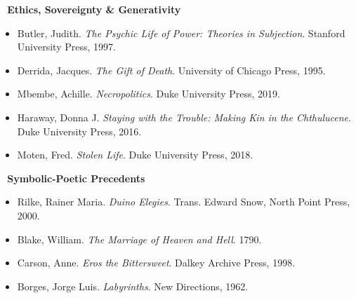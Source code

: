 \textbf{🧬 Ethics, Sovereignty \& Generativity}

\begin{itemize}
\tightlist
\item
  Butler, Judith. \emph{The Psychic Life of Power: Theories in
  Subjection}. Stanford University Press, 1997.
\item
  Derrida, Jacques. \emph{The Gift of Death}. University of Chicago
  Press, 1995.
\item
  Mbembe, Achille. \emph{Necropolitics}. Duke University Press, 2019.
\item
  Haraway, Donna J. \emph{Staying with the Trouble: Making Kin in the
  Chthulucene}. Duke University Press, 2016.
\item
  Moten, Fred. \emph{Stolen Life}. Duke University Press, 2018.
\end{itemize}

\textbf{🔮 Symbolic-Poetic Precedents}

\begin{itemize}
\tightlist
\item
  Rilke, Rainer Maria. \emph{Duino Elegies}. Trans. Edward Snow, North
  Point Press, 2000.
\item
  Blake, William. \emph{The Marriage of Heaven and Hell}. 1790.
\item
  Carson, Anne. \emph{Eros the Bittersweet}. Dalkey Archive Press, 1998.
\item
  Borges, Jorge Luis. \emph{Labyrinths}. New Directions, 1962.
\end{itemize}
